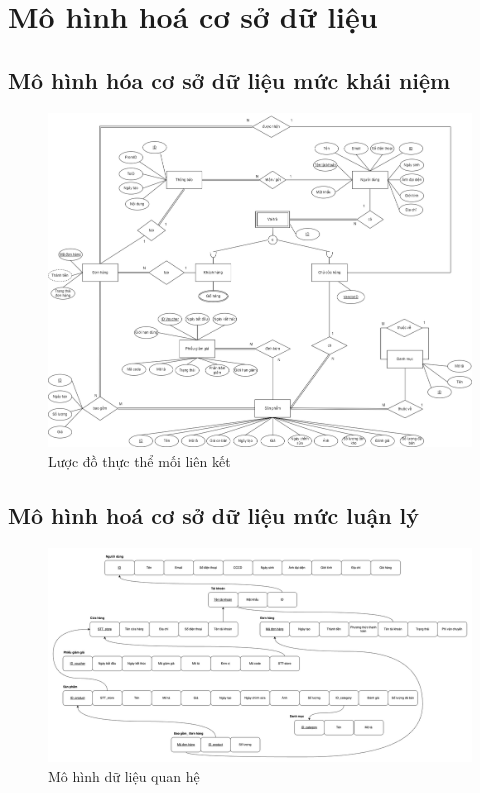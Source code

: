 \section{Mô hình hoá cơ sở dữ liệu}
\subsection{Mô hình hóa cơ sở dữ liệu mức khái niệm}
    \begin{figure}[H]
        \centering
        \includegraphics[width=1.1\linewidth]{Images/ERD.png}
        \vspace{1em}
        \caption{Lược đồ thực thể mối liên kết}
    \end{figure}
\subsection{Mô hình hoá cơ sở dữ liệu mức luận lý}
    \begin{figure}[H]
        \centering
        \includegraphics[width=1.1\linewidth]{Images/mapping.png}
        \vspace{1em}
        \caption{Mô hình dữ liệu quan hệ}
    \end{figure}